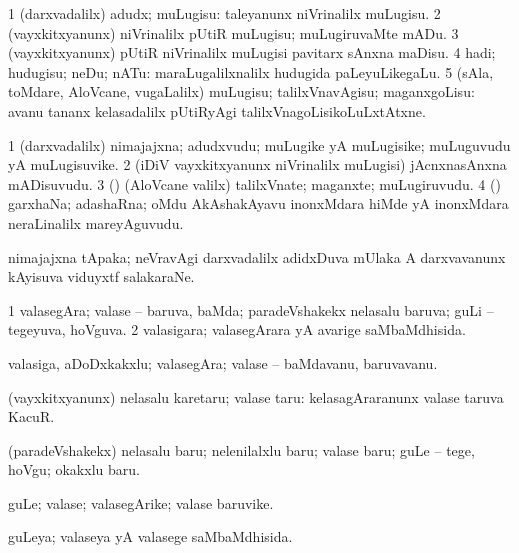 \bentry
{}
\gl{\sakirx}
\bmng
\bnum
\num{1} (darxvadalilx) adudx; muLugisu:  taleyanunx niVrinalilx muLugisu. 
\num{2} (vayxkitxyanunx) niVrinalilx pUtiR muLugisu; muLugiruvaMte mADu. 
\num{3} (vayxkitxyanunx) pUtiR niVrinalilx muLugisi pavitarx sAnxna maDisu. 
\num{4} hadi; hudugisu; neDu; nATu:  maraLugalilxnalilx hudugida paLeyuLikegaLu. 
\num{5} (sAla, toMdare, AloVcane, \mo vugaLalilx) muLugisu; talilxVnavAgisu; maganxgoLisu:  avanu tananx kelasadalilx pUtiRyAgi talilxVnagoLisikoLuLxtAtxne. 
\enum
\emng
\eentry

\bentry
{}
\gl{\nA}
\bmng
\bnum
\num{1} (darxvadalilx) nimajajxna; adudxvudu; muLugike yA muLugisike; muLuguvudu yA muLugisuvike. 
\num{2} (iDiV vayxkitxyanunx niVrinalilx muLugisi) jAcnxnasAnxna mADisuvudu. 
\num{3} (\rUpa) (AloVcane \mo valilx) talilxVnate; maganxte; muLugiruvudu. 
\num{4} (\Kavi) garxhaNa; adashaRna; oMdu AkAshakAyavu inonxMdara hiMde yA inonxMdara neraLinalilx mareyAguvudu. 
\enum
\emng
\eentry

\bentry
{}
\gl{\nA}
\bmng
nimajajxna tApaka; neVravAgi darxvadalilx adidxDuva mUlaka A darxvavanunx kAyisuva viduyxtf salakaraNe. 
\emng
\eentry

\bentry
{}
\gl{\gu}
\bmng
\bnum
\num{1} valasegAra; valase -- baruva, baMda; paradeVshakekx nelasalu baruva; guLi -- tegeyuva, hoVguva. 
\num{2} valasigara; valasegArara yA avarige saMbaMdhisida. 
\enum
\emng
\eentry

\bentry
{}
\gl{\nA}
\bmng
valasiga, aDoDxkakxlu; valasegAra; valase -- baMdavanu, baruvavanu. 
\emng
\eentry

\bentry
{}
\gl{\sakirx}
\bmng
(vayxkitxyanunx) nelasalu karetaru; valase taru:  kelasagAraranunx valase taruva KacuR. 
\emng

\noindent
\gl{\akirx}
\bmng
(paradeVshakekx) nelasalu baru; nelenilalxlu baru; valase baru; guLe -- tege, hoVgu; okakxlu baru. 
\emng
\eentry

\bentry
{}
\gl{\nA}
\bmng
guLe; valase; valasegArike; valase baruvike. 
\emng
\eentry

\bentry
{}
\gl{\gu}
\bmng
guLeya; valaseya yA valasege saMbaMdhisida. 
\emng
\eentry

